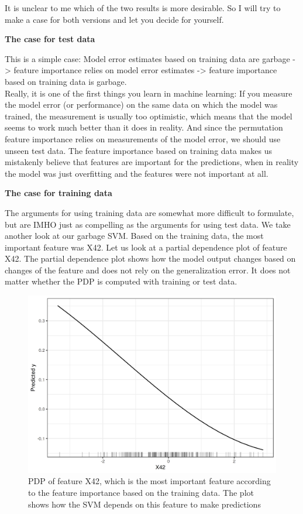 \documentclass[12pt,]{krantz}
\begin{document}
It is unclear to me which of the two results is more desirable. So I
will try to make a case for both versions and let you decide for
yourself.

\textbf{The case for test data}

This is a simple case: Model error estimates based on training data are
garbage -\textgreater{} feature importance relies on model error
estimates -\textgreater{} feature importance based on training data is
garbage.\\
Really, it is one of the first things you learn in machine learning: If
you measure the model error (or performance) on the same data on which
the model was trained, the measurement is usually too optimistic, which
means that the model seems to work much better than it does in reality.
And since the permutation feature importance relies on measurements of
the model error, we should use unseen test data. The feature importance
based on training data makes us mistakenly believe that features are
important for the predictions, when in reality the model was just
overfitting and the features were not important at all.

\textbf{The case for training data}

The arguments for using training data are somewhat more difficult to
formulate, but are IMHO just as compelling as the arguments for using
test data. We take another look at our garbage SVM. Based on the
training data, the most important feature was X42. Let us look at a
partial dependence plot of feature X42. The partial dependence plot
shows how the model output changes based on changes of the feature and
does not rely on the generalization error. It does not matter whether
the PDP is computed with training or test data.

\begin{figure}

{\centering \includegraphics[width=\textwidth]{images/garbage-svm-pdp-1} 

}

\caption{PDP of feature X42, which is the most important feature according to the feature importance based on the training data. The plot shows how the SVM depends on this feature to make predictions}\label{fig:garbage-svm-pdp}
\end{figure}
\end{document}
